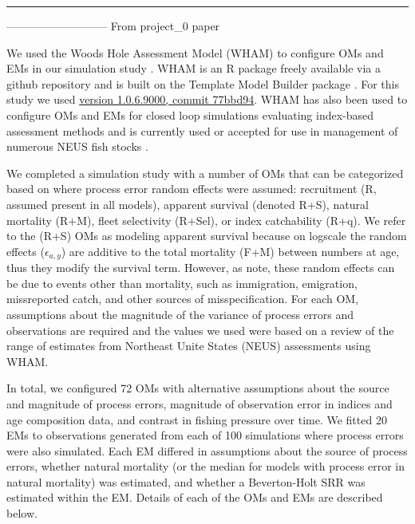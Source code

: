 \documentclass[
  12pt,
]{article}
\begin{document}
\begin{center}\rule{0.5\linewidth}{0.5pt}\end{center}

--------------------------- From project\_0 paper

We used the Woods Hole Assessment Model (WHAM) to configure OMs and EMs in our simulation study \citep{millerstock20, stockmiller21}. WHAM is an R package freely available via a github repository and is built on the Template Model Builder package \citep{kristensenetal16}. For this study we used \href{https://github.com/timjmiller/wham/tree/77bbd946e4881216a439933473d1c58b21c270c3}{version 1.0.6.9000, commit 77bbd94}. WHAM has also been used to configure OMs and EMs for closed loop simulations evaluating index-based assessment methods \citep{legaultetal23} and is currently used or accepted for use in management of numerous NEUS fish stocks \citep[e.g.,][]{nefsc22, nefsc22a, nefsc24}.

We completed a simulation study with a number of OMs that can be categorized based on where process error random effects were assumed: recruitment (R, assumed present in all models), apparent survival (denoted R+S), natural mortality (R+M), fleet selectivity (R+Sel), or index catchability (R+q). We refer to the (R+S) OMs as modeling apparent survival because on logscale the random effects (\(\epsilon_{a,y}\)) are additive to the total mortality (F+M) between numbers at age, thus they modify the survival term. However, as \citet{stockmiller21} note, these random effects can be due to events other than mortality, such as immigration, emigration, missreported catch, and other sources of misspecification. For each OM, assumptions about the magnitude of the variance of process errors and observations are required and the values we used were based on a review of the range of estimates from Northeast Unite States (NEUS) assessments using WHAM.

In total, we configured 72 OMs with alternative assumptions about the source and magnitude of process errors, magnitude of observation error in indices and age composition data, and contrast in fishing pressure over time. We fitted 20 EMs to observations generated from each of 100 simulations where process errors were also simulated. Each EM differed in assumptions about the source of process errors, whether natural mortality (or the median for models with process error in natural mortality) was estimated, and whether a Beverton-Holt SRR was estimated within the EM. Details of each of the OMs and EMs are described below.
\end{document}
